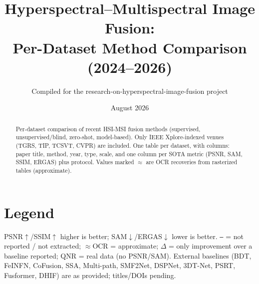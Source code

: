 \documentclass[11pt]{article}
\title{Hyperspectral--Multispectral Image Fusion:\\
Per-Dataset Method Comparison (2024--2026)}
\author{Compiled for the research-on-hyperspectral-image-fusion project}
\date{August 2026}
\begin{document}
\maketitle

\begin{abstract}
Per-dataset comparison of recent HSI-MSI fusion methods (supervised,
unsupervised/blind, zero-shot, model-based). Only IEEE Xplore-indexed venues
(TGRS, TIP, TCSVT, CVPR) are included. One table per dataset, with columns:
paper title, method, year, type, scale, and one column per SOTA metric
(PSNR, SAM, SSIM, ERGAS) plus protocol. Values marked $\approx$ are OCR
recoveries from rasterized tables (approximate).
\end{abstract}

\section*{Legend}
PSNR$\uparrow$/SSIM$\uparrow$ higher is better; SAM$\downarrow$/ERGAS$\downarrow$
lower is better. \texttt{--} = not reported / not extracted; $\approx$OCR =
approximate; $\Delta$ = only improvement over a baseline reported; QNR = real
data (no PSNR/SAM). External baselines (BDT, FeINFN, CoFusion, SSA, Multi-path,
SMF2Net, DSPNet, 3DT-Net, PSRT, Fusformer, DHIF) are as provided; titles/DOIs
pending.
\end{document}
